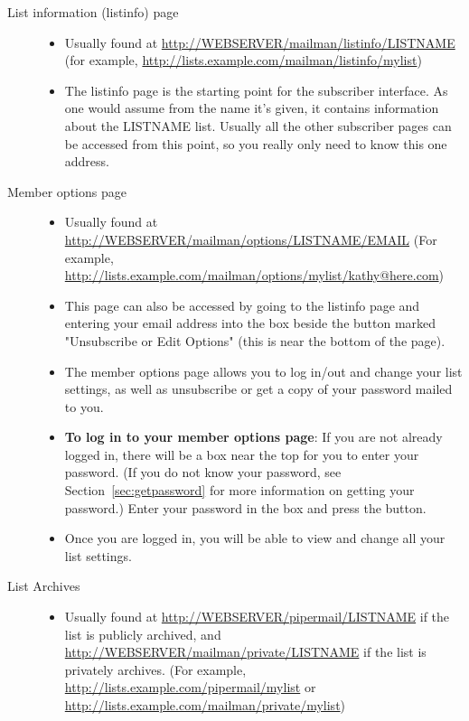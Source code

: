 \documentclass{howto}
\begin{document}
\begin{description}
	\item [List information (listinfo) page]
		\begin{itemize}
			\item Usually found at \url{http://WEBSERVER/mailman/listinfo/LISTNAME}
			 (for example, \url{http://lists.example.com/mailman/listinfo/mylist})

			\item The listinfo page is the starting point for the subscriber
			interface.  As one would assume from the name it's given, it 
			contains information about the LISTNAME list.
			Usually all the other subscriber pages can be accessed from this
			point, so you really only need to know this one address.

		\end{itemize}

	\item [Member options page]
		\begin{itemize}
			\item Usually found at \url{http://WEBSERVER/mailman/options/LISTNAME/EMAIL}
			(For example, \url{http://lists.example.com/mailman/options/mylist/kathy@here.com})

			\item This page can also be accessed by going to the listinfo page
			and entering your email address into the box beside the button
			marked "Unsubscribe or Edit Options" (this is near the bottom of the
			page).

			\item The member options page allows you to log in/out and change your 
			list settings, as well as unsubscribe or get a copy of your password
			mailed to you. 

			\item \textbf{To log in to your member options page}: 
			If you are not already logged in, there will be a box near the top for
			you to enter your password.  (If you do not know your password, see 
			Section~\ref{sec:getpassword} for more information on getting your 
			password.)  Enter your password in the box and press the button.

			\item Once you are logged in, you will be able to view and change
			all your list settings.

		\end{itemize}
	\item [List Archives] 
		\begin{itemize}
			\item Usually found at \url{http://WEBSERVER/pipermail/LISTNAME} if the 
			list is publicly archived, and 
			\url{http://WEBSERVER/mailman/private/LISTNAME} if the list is privately
			archives.  (For example, 
			\url{http://lists.example.com/pipermail/mylist} or
			\url{http://lists.example.com/mailman/private/mylist})


\end{itemize}
\end{description}
\end{document}
